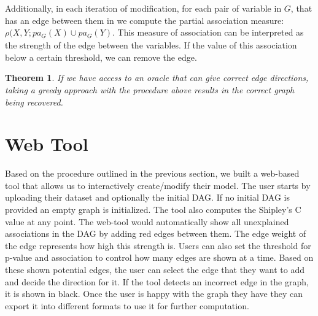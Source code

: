 \documentclass[letterpaper]{article} %
\newtheorem{theorem}{Theorem}
\begin{document}
Additionally, in each iteration of modification, for each pair of variable in $
G $, that has an edge between them in we compute the partial association
measure: $ \rho(X, Y; pa_{\underline{G}}(X) \cup pa_{\underline{G}}(Y) $. This
measure of association can be interpreted as the strength of the edge between
the variables. If the value of this association below a certain threshold, we
can remove the edge.

\begin{theorem}
	If we have access to an oracle that can give correct edge directions, taking a
	greedy approach with the procedure above results in the correct graph
	being recovered. 
\end{theorem}

\section{Web Tool}
\label{sec:web}
Based on the procedure outlined in the previous section, we built a web-based
tool that allows us to interactively create/modify their model. The user
starts by uploading their dataset and optionally the initial DAG. If no initial
DAG is provided an empty graph is initialized. The tool also computes the
Shipley's C value at any point. The web-tool would automatically show all
unexplained associations in the DAG by adding red edges between them. The edge
weight of the edge represents how high this strength is. Users can also set the
threshold for p-value and association to control how many edges are shown at a
time. Based on these shown potential edges, the user can select the edge that
they want to add and decide the direction for it. If the tool detects an
incorrect edge in the graph, it is shown in black. Once the user is happy with
the graph they have they can export it into different formats to use it for
further computation.


\end{document}
